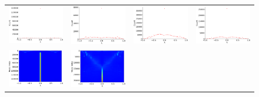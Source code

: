 \documentclass[senior,final,11pt]{iscs-thesis}
\begin{document}
\begin{figure}[htbp]
  \setlength\tabcolsep{0pt}
  \hspace{-3.0cm}
  \begin{tabular}{cccc}
    \includegraphics[width=45mm]{figure/soc-doubanmtx_dos.png} &
    \includegraphics[width=45mm]{figure/soc-epinionsmtx_dos.png} &
    \includegraphics[width=45mm]{figure/soc-gowallamtx_dos.png} &
    \includegraphics[width=45mm]{figure/soc-slashdotmtx_dos.png} \\
    \includegraphics[width=45mm]{figure/soc-doubanmtx_pdos.png} &
    \includegraphics[width=45mm]{figure/soc-epinionsmtx_pdos.png} &

\end{tabular}
\end{figure}
\end{document}
